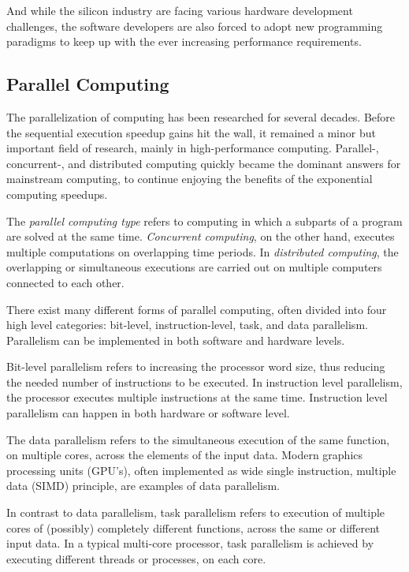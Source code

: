 And while the silicon industry are facing various hardware development challenges, the software developers are also forced to adopt new programming paradigms to keep up with the ever increasing performance requirements.~\cite{Sutter:2005:FLiO}

\subsection{Parallel Computing}
\label{subsection:parallel-computing}

The parallelization of computing has been researched for several decades. Before the sequential execution speedup gains hit the wall, it remained a minor but important field of research, mainly in high-performance computing. Parallel-, concurrent-, and distributed computing quickly became the dominant answers for mainstream computing, to continue enjoying the benefits of the exponential computing speedups.

The \emph{parallel computing type} refers to computing in which a subparts of a program are solved at the same time. \emph{Concurrent computing}, on the other hand, executes multiple computations on overlapping time periods. In \emph{distributed computing}, the overlapping or simultaneous executions are carried out on multiple computers connected to each other.

There exist many different forms of parallel computing, often divided into four high level categories: bit-level, instruction-level, task, and data parallelism. Parallelism can be implemented in both software and hardware levels.~\cite{Culler:1997:PCA}

Bit-level parallelism refers to increasing the processor word size, thus reducing the needed number of instructions to be executed. In instruction level parallelism, the processor executes multiple instructions at the same time. Instruction level parallelism can happen in both hardware or software level.~\cite{Culler:1997:PCA}

The data parallelism refers to the simultaneous execution of the same function, on multiple cores, across the elements of the input data. Modern graphics processing units (GPU's), often implemented as wide single instruction, multiple data (SIMD) principle, are examples of data parallelism.~\cite{Culler:1997:PCA}

In contrast to data parallelism, task parallelism refers to execution of multiple cores of (possibly) completely different functions, across the same or different input data. In a typical multi-core processor, task parallelism is achieved by executing different threads or processes, on each core.~\cite{Culler:1997:PCA}

